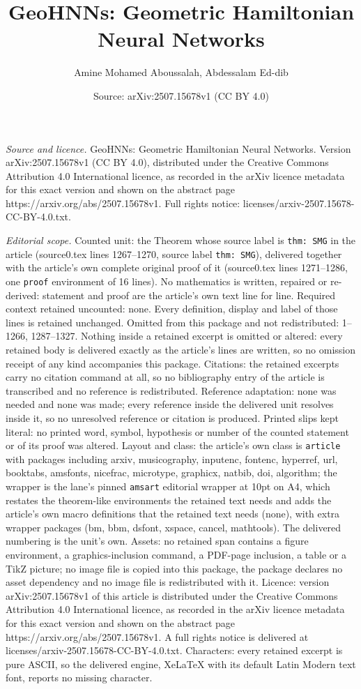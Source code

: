\documentclass[10pt,a4paper]{amsart}
\title[GeoHNNs: Geometric Hamiltonian Neural Networks]{GeoHNNs: Geometric Hamiltonian Neural Networks}
\author{Amine Mohamed Aboussalah, Abdessalam Ed-dib}
\date{Source: arXiv:2507.15678v1 (CC BY 4.0)}
\begin{document}
\maketitle

\noindent\emph{Source and licence.} GeoHNNs: Geometric Hamiltonian Neural Networks. Version arXiv:2507.15678v1 (CC BY 4.0), distributed under the Creative Commons Attribution 4.0 International licence, as recorded in the arXiv licence metadata for this exact version and shown on the abstract page https://arxiv.org/abs/2507.15678v1. Full rights notice: licenses/arxiv-2507.15678-CC-BY-4.0.txt.\par\smallskip

\noindent\textit{Editorial scope.} Counted unit: the Theorem whose source label is \texttt{thm: SMG} in the article (source0.tex lines 1267--1270, source label \texttt{thm: SMG}), delivered together with the article's own complete original proof of it (source0.tex lines 1271--1286, one \texttt{proof} environment of 16 lines). No mathematics is written, repaired or re-derived: statement and proof are the article's own text line for line. Required context retained uncounted: none. Every definition, display and label of those lines is retained unchanged. Omitted from this package and not redistributed: 1--1266, 1287--1327. Nothing inside a retained excerpt is omitted or altered: every retained body is delivered exactly as the article's lines are written, so no omission receipt of any kind accompanies this package. Citations: the retained excerpts carry no citation command at all, so no bibliography entry of the article is transcribed and no reference is redistributed. Reference adaptation: none was needed and none was made; every reference inside the delivered unit resolves inside it, so no unresolved reference or citation is produced. Printed slips kept literal: no printed word, symbol, hypothesis or number of the counted statement or of its proof was altered. Layout and class: the article's own class is \texttt{article} with packages including arxiv, musicography, inputenc, fontenc, hyperref, url, booktabs, amsfonts, nicefrac, microtype, graphicx, natbib, doi, algorithm; the wrapper is the lane's pinned \texttt{amsart} editorial wrapper at 10pt on A4, which restates the theorem-like environments the retained text needs and adds the article's own macro definitions that the retained text needs (none), with extra wrapper packages (bm, bbm, dsfont, xspace, cancel, mathtools). The delivered numbering is the unit's own. Assets: no retained span contains a figure environment, a graphics-inclusion command, a PDF-page inclusion, a table or a TikZ picture; no image file is copied into this package, the package declares no asset dependency and no image file is redistributed with it. Licence: version arXiv:2507.15678v1 of this article is distributed under the Creative Commons Attribution 4.0 International licence, as recorded in the arXiv licence metadata for this exact version and shown on the abstract page https://arxiv.org/abs/2507.15678v1. A full rights notice is delivered at licenses/arxiv-2507.15678-CC-BY-4.0.txt. Characters: every retained excerpt is pure ASCII, so the delivered engine, XeLaTeX with its default Latin Modern text font, reports no missing character.
\end{document}

